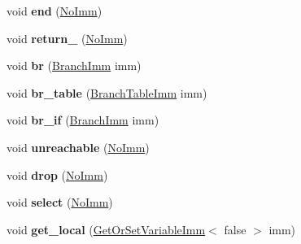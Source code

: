 \begin{DoxyCompactItemize}
void {\bfseries end} (\mbox{\hyperlink{struct_i_r_1_1_no_imm}{No\+Imm}})
\item 
\mbox{\label{struct_w_a_s_t_1_1_function_print_context_a91057b4ee522f300dc21d7fcd63f225f}} 
void {\bfseries return\+\_\+} (\mbox{\hyperlink{struct_i_r_1_1_no_imm}{No\+Imm}})
\item 
\mbox{\label{struct_w_a_s_t_1_1_function_print_context_a9837518bcac141a250e5638b8d212702}} 
void {\bfseries br} (\mbox{\hyperlink{struct_i_r_1_1_branch_imm}{Branch\+Imm}} imm)
\item 
\mbox{\label{struct_w_a_s_t_1_1_function_print_context_a8ccc3e7c206d3e33f730fb594ba88dfe}} 
void {\bfseries br\+\_\+table} (\mbox{\hyperlink{struct_i_r_1_1_branch_table_imm}{Branch\+Table\+Imm}} imm)
\item 
\mbox{\label{struct_w_a_s_t_1_1_function_print_context_ac4a5430cc0944722732ccd50f15b78ee}} 
void {\bfseries br\+\_\+if} (\mbox{\hyperlink{struct_i_r_1_1_branch_imm}{Branch\+Imm}} imm)
\item 
\mbox{\label{struct_w_a_s_t_1_1_function_print_context_ae725fef743c0258fb9be8549e6353db7}} 
void {\bfseries unreachable} (\mbox{\hyperlink{struct_i_r_1_1_no_imm}{No\+Imm}})
\item 
\mbox{\label{struct_w_a_s_t_1_1_function_print_context_a32d98a6db8ee1f67499447f07334d550}} 
void {\bfseries drop} (\mbox{\hyperlink{struct_i_r_1_1_no_imm}{No\+Imm}})
\item 
\mbox{\label{struct_w_a_s_t_1_1_function_print_context_a273223d406aa3eef791e400671740300}} 
void {\bfseries select} (\mbox{\hyperlink{struct_i_r_1_1_no_imm}{No\+Imm}})
\item 
\mbox{\label{struct_w_a_s_t_1_1_function_print_context_a2e904cbacdf531d8aae9c3b17cc6006c}} 
void {\bfseries get\+\_\+local} (\mbox{\hyperlink{struct_i_r_1_1_get_or_set_variable_imm}{Get\+Or\+Set\+Variable\+Imm}}$<$ false $>$ imm)

\end{DoxyCompactItemize}
